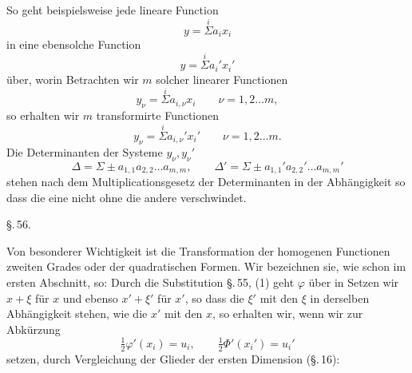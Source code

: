 
So geht beispielsweise jede lineare Function
\[
y = \overset{i}{\Sigma} a_i x_i
\]
in eine ebensolche Function
\[
y = \overset{i}{\Sigma} a_i' x_i'
\]
über, worin
Betrachten wir $m$ solcher linearer Functionen
\[
y_\nu = \overset{i}{\Sigma} a_{i,\nu} x_i \qquad \nu = 1, 2 \ldots m,
\]
so erhalten wir $m$ transformirte Functionen
\[
y_\nu = \overset{i}{\Sigma} a_{i,\nu}' x_i' \qquad \nu = 1, 2 \ldots m.
\]
Die Determinanten der Systeme $y_\nu, y_\nu'$
\[
\Delta = \Sigma \pm a_{1,1} a_{2,2} \ldots a_{m,m}, \qquad \Delta' = \Sigma \pm a_{1,1}' a_{2,2}' \ldots a_{m,m}'
\]
stehen nach dem Multiplicationsgesetz der Determinanten in der Abhängigkeit
so dass die eine nicht ohne die andere verschwindet.

\begin{center}
\S.\,56.

\end{center}

Von besonderer Wichtigkeit ist die Transformation der homogenen Functionen zweiten Grades oder der quadratischen Formen. Wir bezeichnen sie, wie schon im ersten Abschnitt, so:
Durch die Substitution \S.\,55, (1) geht $\varphi$ über in
Setzen wir $x + \xi$ für $x$ und ebenso $x' + \xi'$ für $x'$, so dass die $\xi'$ mit den $\xi$ in derselben Abhängigkeit stehen, wie die $x'$ mit den $x$, so erhalten wir, wenn wir zur Abkürzung
\[
\tfrac{1}{2}\varphi'(x_i) = u_i, \qquad \tfrac{1}{2}\Phi'(x_i') = u_i'
\]
setzen, durch Vergleichung der Glieder der ersten Dimension (\S.\,16):

